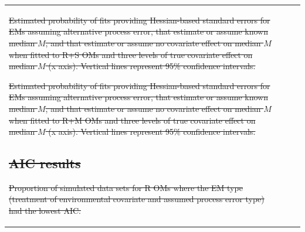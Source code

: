 \documentclass[
  12pt,
]{article}
\makeatletter
\providecommand{\DIFdel}[1]{{\protect\color{red}\sout{#1}}} %
\providecommand{\DIFdelFL}[1]{\DIFdel{#1}} %
\let\sout@orig\sout %
\renewcommand{\sout}[1]{\ifmmode\text{\sout@orig{\ensuremath{#1}}}\else\sout@orig{#1}\fi} %
\makeatother
\begin{document}
\begin{table}
{\begin{center}
\begin{tabular}{lrrr}
{%
\DIFdelFL{Estimated probability of fits providing Hessian-based standard errors for EMs assuming alternative process error, that estimate or assume known median $M$, and that estimate or assume no covariate effect on median $M$ when fitted to R+S OMs and three levels of true covariate effect on median $M$ (x axis). Vertical lines represent 95\% confidence intervals.}}%

{%
\DIFdelFL{Estimated probability of fits providing Hessian-based standard errors for EMs assuming alternative process error, that estimate or assume known median $M$, and that estimate or assume no covariate effect on median $M$ when fitted to R+M OMs and three levels of true covariate effect on median $M$ (x axis). Vertical lines represent 95\% confidence intervals.}}%

\subsection*{\DIFdel{AIC results}}%
\addcontentsline{toc}{subsection}{\DIFdel{AIC results}}

{%
\DIFdelFL{Proportion of simulated data sets for R OMs where the EM type (treatment of environmental covariate and assumed process error type) had the lowest AIC.}}%


\end{tabular}
\end{center}}
\end{table}
\end{document}
